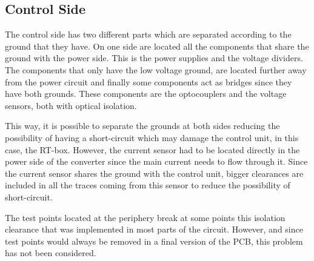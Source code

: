 \subsection{Control Side} \label{PCB_Control}
The control side has two different parts which are separated according to the ground that they have. On one side are located all the components that share the ground with the power side. This is the power supplies and the voltage dividers. The components that only have the low voltage ground, are located further away from the power circuit and finally some components act as bridges since they have both grounds. These components are the optocouplers and the voltage sensors, both with optical isolation.
 
This way, it is possible to separate the grounds at both sides reducing the possibility of having a short-circuit which may damage the control unit, in this case, the RT-box. However, the current sensor had to be located directly in the power side of the converter since the main current needs to flow through it. Since the current sensor shares the ground with the control unit, bigger clearances are included in all the traces coming from this sensor to reduce the possibility of short-circuit. 

The test points located at the periphery break at some points this isolation clearance that was implemented in most parts of the circuit. However, and since test points would always be removed in a final version of the PCB, this problem has not been considered.
